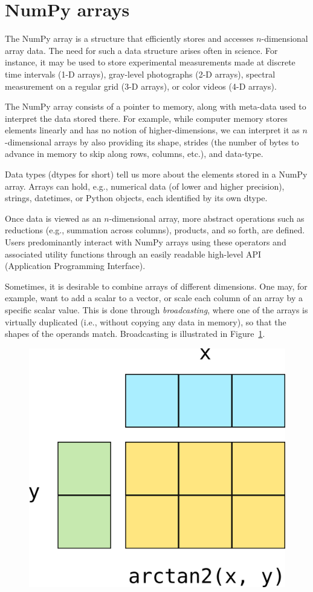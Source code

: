 
\section*{NumPy arrays}

The NumPy array is a structure that efficiently stores and accesses
$n$-dimensional array data\cite{vanderwalt2011numpy}.
The need for such a data structure arises often in science.
For instance, it may be used to store experimental measurements made at
discrete time intervals (1-D arrays), gray-level photographs (2-D arrays),
spectral measurement on a regular grid (3-D arrays), or color videos (4-D
arrays).

The NumPy array consists of a pointer to memory, along with meta-data used to
interpret the data stored there.
For example, while computer memory stores elements linearly and has no notion
of higher-dimensions, we can interpret it as $n$-dimensional arrays by also
providing its shape, strides (the number of bytes to advance in memory to skip
along rows, columns, etc.), and data-type.

Data types (dtypes for short) tell us more about the elements stored in a NumPy
array.
Arrays can hold, e.g., numerical data (of lower and higher precision), strings,
datetimes, or Python objects, each identified by its own dtype.

Once data is viewed as an $n$-dimensional array, more abstract operations such as
reductions (e.g., summation across columns), products, and so forth, are defined.
Users predominantly interact with NumPy arrays using these operators and
associated utility functions through an easily readable high-level API
(Application Programming Interface).

Sometimes, it is desirable to combine arrays of different dimensions.
One may, for example, want to add a scalar to a vector, or scale each column of
an array by a specific scalar value.
This is done through {\em broadcasting}, where one of the arrays is virtually
duplicated (i.e., without copying any data in memory), so that the shapes of
the operands match.
Broadcasting is illustrated in Figure~\ref{fig:broadcasting}.

\begin{figure}
  \centering
  \includegraphics[width=0.5\linewidth]{static/broadcasting}
  \caption{
   }
  \label{fig:broadcasting}
\end{figure}

